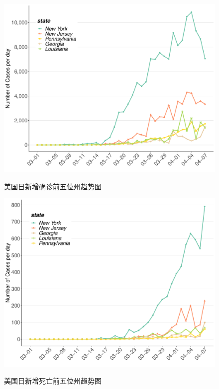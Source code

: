 \documentclass[]{article}
\begin{document}
\begin{figure}[H]
\caption{美国日新增确诊前五位州趋势图} %
\centering
\includegraphics[]{./input/covid5.pdf} 
\label{} %
\end{figure}

\begin{figure}[H]
\caption{美国日新增死亡前五位州趋势图} %
\centering
\includegraphics[]{./input/covid6.pdf} 
\label{} %
\end{figure}
\end{document}
